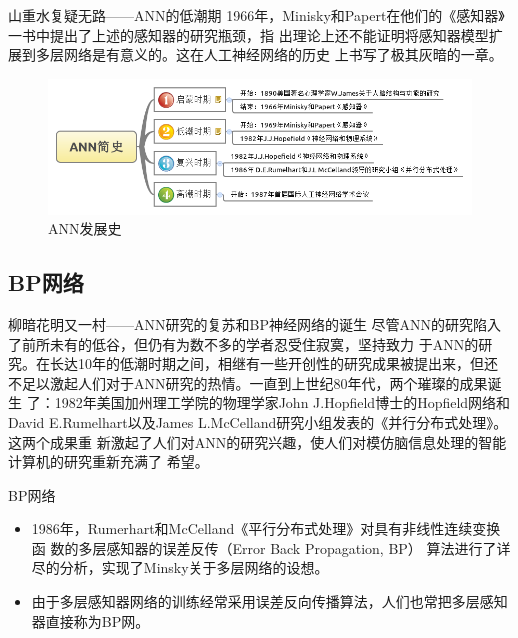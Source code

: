 \documentclass[xcolor=svgnames]{beamer}
\begin{document}
\begin{frame}{山重水复疑无路——ANN的低潮期}
  1966年，Minisky和Papert在他们的《感知器》一书中提出了上述的感知器的研究瓶颈，指
  出理论上还不能证明将感知器模型扩展到多层网络是有意义的。这在人工神经网络的历史
  上书写了极其灰暗的一章。
  \begin{figure}
    \centering
    \includegraphics[width=\textwidth]{fig05.png}
    \caption{ANN发展史}
    \label{fig:history}
  \end{figure}
\end{frame}

\subsection{BP网络}

\begin{frame}{柳暗花明又一村——ANN研究的复苏和BP神经网络的诞生}
  尽管ANN的研究陷入了前所未有的低谷，但仍有为数不多的学者忍受住寂寞，坚持致力
  于ANN的研究。在长达10年的低潮时期之间，相继有一些开创性的研究成果被提出来，但还
  不足以激起人们对于ANN研究的热情。一直到上世纪80年代，两个璀璨的成果诞生
  了：1982年美国加州理工学院的物理学家John J.Hopfield博士的Hopfield网络和David
  E.Rumelhart以及James L.McCelland研究小组发表的《并行分布式处理》。这两个成果重
  新激起了人们对ANN的研究兴趣，使人们对模仿脑信息处理的智能计算机的研究重新充满了
  希望。
\end{frame}

\begin{frame}{BP网络}
  \begin{itemize}
  \item
    1986年，Rumerhart和McCelland《平行分布式处理》对具有非线性连续变换函%
    数的多层感知器的\alert{误差反传（Error Back Propagation, BP）%
      算法}进行了详尽的分析，实现了Minsky关于多层网络的设想。
  \item
    由于多层感知器网络的训练经常采用误差反向传播算法，人们也常把多层感知器直接称为BP网。
  \end{itemize}
\end{frame}
\end{document}
